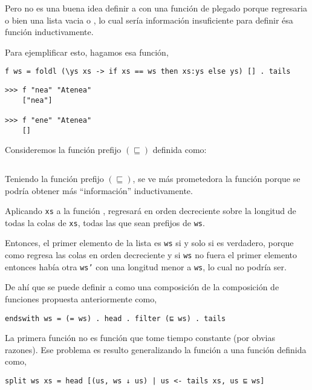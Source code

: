 Pero no es una buena idea definir a  con una función de plegado
 porque regresaria o bien una lista vacia o \hsCode{[ws]}, lo cual sería información
insuficiente para definir ésa función inductivamente.

Para ejemplificar esto, hagamos esa función,
\begin{verbatim}
f ws = foldl (\ys xs -> if xs == ws then xs:ys else ys) [] . tails
\end{verbatim}

\begin{verbatim}
>>> f "nea" "Atenea"
    ["nea"]

>>> f "ene" "Atenea"
    []
\end{verbatim}

Consideremos la función prefijo $(\sqsubseteq)$ definida como:

\inputminted{haskell}{definiciones/prefix.hs}

Teniendo la función prefijo $(\sqsubseteq)$, se ve más prometedora la función
 porque se podría obtener más ``información'' inductivamente.

Aplicando \texttt{xs} a la función , regresará en orden decreciente
sobre la longitud de todas la colas de \texttt{xs}, todas las que sean prefijos de \texttt{ws}.


Entonces, el primer elemento de la lista es \texttt{ws} si y solo si  es
verdadero, porque como  regresa las colas en orden decreciente y si \texttt{ws} no 
fuera el primer elemento entonces había otra \texttt{ws'} con una longitud menor a \texttt{ws}, lo
cual no podría ser.

De ahí que se puede definir a  como una composición de la composición de funciones
 propuesta anteriormente como,

\begin{verbatim}
endswith ws = (= ws) . head . filter (⊑ ws) . tails
\end{verbatim}

La primera función  no es función que tome tiempo constante (por obvias razones). 
Ese problema es resulto generalizando la función  a una función
 definida como,

\begin{verbatim}
split ws xs = head [(us, ws ↓ us) | us <- tails xs, us ⊑ ws]
\end{verbatim}

